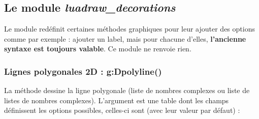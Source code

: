 \subsection{Le module \emph{luadraw\_decorations}}

Le module  redéfinit certaines méthodes graphiques pour leur ajouter des options comme par exemple : ajouter un label, mais pour chacune d'elles, \textbf{l'ancienne syntaxe est toujours valable}. Ce module ne renvoie rien.

\subsubsection{Lignes polygonales 2D : g:Dpolyline()}\label{dec:dpolyline}

La méthode  dessine la ligne polygonale  (liste de nombres complexes ou liste de listes de nombres complexes). L'argument  est une table dont les champs définissent les options possibles, celles-ci sont (avec leur valeur par défaut) :
